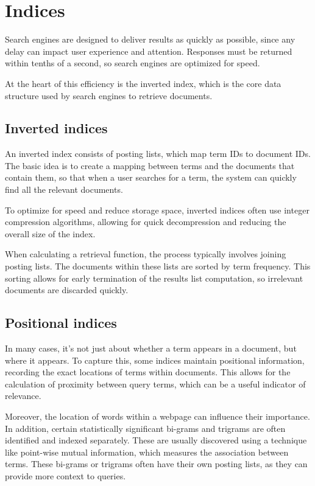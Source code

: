 \section{Indices}
Search engines are designed to deliver results as quickly as possible, since any delay can impact user experience and attention. 
Responses must be returned within tenths of a second, so search engines are optimized for speed.

At the heart of this efficiency is the inverted index, which is the core data structure used by search engines to retrieve documents.

\subsection{Inverted indices}
An inverted index consists of posting lists, which map term IDs to document IDs. 
The basic idea is to create a mapping between terms and the documents that contain them, so that when a user searches for a term, the system can quickly find all the relevant documents.

To optimize for speed and reduce storage space, inverted indices often use integer compression algorithms, allowing for quick decompression and reducing the overall size of the index.

When calculating a retrieval function, the process typically involves joining posting lists. 
The documents within these lists are sorted by term frequency. 
This sorting allows for early termination of the results list computation, so irrelevant documents are discarded quickly.

\subsection{Positional indices}
In many cases, it's not just about whether a term appears in a document, but where it appears. 
To capture this, some indices maintain positional information, recording the exact locations of terms within documents. 
This allows for the calculation of proximity between query terms, which can be a useful indicator of relevance.

Moreover, the location of words within a webpage can influence their importance. 
In addition, certain statistically significant bi-grams and trigrams are often identified and indexed separately. 
These are usually discovered using a technique like point-wise mutual information, which measures the association between terms. 
These bi-grams or trigrams often have their own posting lists, as they can provide more context to queries.


